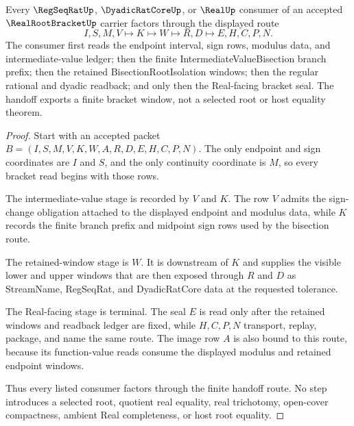 \begin{theorem}
\label{thm:real-root-bracket-bisection-handoff}
Every $\RegSeqRatUp$, $\DyadicRatCoreUp$, or $\RealUp$ consumer of an accepted $\RealRootBracketUp$ carrier factors through the displayed route
$$
I,S,M,V \longmapsto K \longmapsto W \longmapsto R,D \longmapsto E,H,C,P,N .
$$
The consumer first reads the endpoint interval, sign rows, modulus data, and intermediate-value ledger; then the finite IntermediateValueBisection branch prefix; then the retained BisectionRootIsolation windows; then the regular rational and dyadic readback; and only then the Real-facing bracket seal. The handoff exports a finite bracket window, not a selected root or host equality theorem.
\end{theorem}
\begin{proof}
Start with an accepted packet $B=(I,S,M,V,K,W,A,R,D,E,H,C,P,N)$. The only endpoint and sign coordinates are $I$ and $S$, and the only continuity coordinate is $M$, so every bracket read begins with those rows.

The intermediate-value stage is recorded by $V$ and $K$. The row $V$ admits the sign-change obligation attached to the displayed endpoint and modulus data, while $K$ records the finite branch prefix and midpoint sign rows used by the bisection route.

The retained-window stage is $W$. It is downstream of $K$ and supplies the visible lower and upper windows that are then exposed through $R$ and $D$ as StreamName, RegSeqRat, and DyadicRatCore data at the requested tolerance.

The Real-facing stage is terminal. The seal $E$ is read only after the retained windows and readback ledger are fixed, while $H,C,P,N$ transport, replay, package, and name the same route. The image row $A$ is also bound to this route, because its function-value reads consume the displayed modulus and retained endpoint windows.

Thus every listed consumer factors through the finite handoff route. No step introduces a selected root, quotient real equality, real trichotomy, open-cover compactness, ambient Real completeness, or host root equality.
\end{proof}


